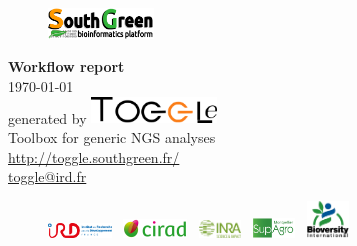 \begin{titlepage}

\vspace*{3cm}

\begin{center}

\begin{figure}[t]
\includegraphics[width=0.25\textwidth,right]{../img/SGLogo.png}
\end{figure}

\Huge \textbf {Workflow report}\\[0.2in]
\Large \today\\[1.5in]

\normalsize generated by \includegraphics[width=0.25\textwidth]{../img/toggleLogo2.png} \\[0.1in]
\small Toolbox for generic NGS analyses\\[0.5in]
\small\url{http://toggle.southgreen.fr/}\\
    	\href{mailto:toggle@ird.fr}{toggle@ird.fr}\\
        \vspace{0.7in}
\centering 



\begin{figure}[b]
\centering
\includegraphics[width=0.15\textwidth]{../img/IRDLogo.png}
\,
\includegraphics[width=0.15\textwidth]{../img/ciradLogo.png}
\,
\includegraphics[width=0.1\textwidth]{../img/inraLogo.png}
\,
\includegraphics[width=0.1\textwidth]{../img/supagroLogo.png}
\,
\includegraphics[width=0.1\textwidth]{../img/bioversityLogo.png}
\end{figure}

\end{center}

\end{titlepage}

